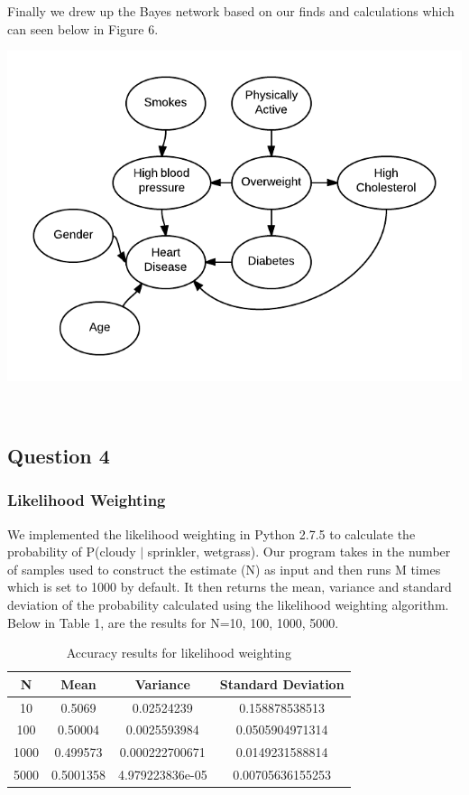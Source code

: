 \documentclass{article}
\begin{document}
Finally we drew up the Bayes network based on our finds and calculations which can seen below in Figure 6.

\begin{minipage}{\linewidth}
\begin{center}
\includegraphics[scale=0.5]{part3_bn}
\end{center}
\end{minipage}\\

\subsection{Question 4}
\subsubsection{Likelihood Weighting}

We implemented the likelihood weighting in Python 2.7.5 to calculate the probability of P(cloudy $|$ sprinkler, wetgrass). Our program takes in the number of samples used to construct the estimate (N) as input and then runs M times which is set to 1000 by default. It then returns the mean, variance and standard deviation of the probability calculated using the likelihood weighting algorithm.\\

Below in Table 1, are the results for N=10, 100, 1000, 5000.

\begin{table}[h]
\centering
\begin{tabular}{|c|c|c|c|}
\hline
N    & Mean      & Variance        & Standard Deviation \\ \hline
10   & 0.5069    & 0.02524239      & 0.158878538513     \\ \hline
100  & 0.50004   & 0.0025593984    & 0.0505904971314    \\ \hline
1000 & 0.499573  & 0.000222700671  & 0.0149231588814    \\ \hline
5000 & 0.5001358 & 4.979223836e-05 & 0.00705636155253   \\ \hline
\end{tabular}
\caption {Accuracy results for likelihood weighting}
\end{table}
\end{document}
